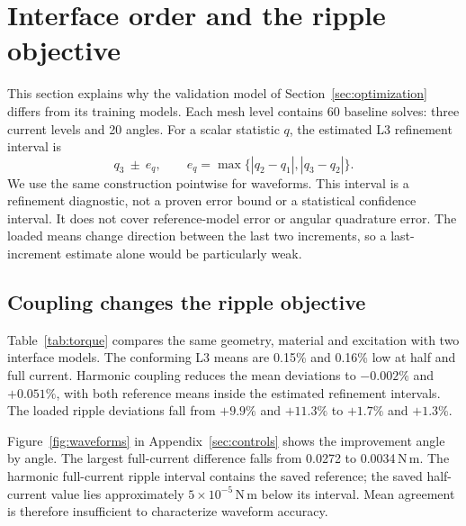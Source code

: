 \documentclass{anvil-paper}
\begin{document}


\section{Interface order and the ripple objective}\label{sec:forward}
This section explains why the validation model of
Section~\ref{sec:optimization} differs from its training models. Each mesh
level contains 60 baseline solves: three current levels and 20 angles. For
a scalar statistic $q$, the estimated L3 refinement interval is
\begin{equation}
 q_3\ \pm\ e_q,\qquad
 e_q=\max\{|q_2-q_1|,|q_3-q_2|\}.
 \label{eq:band}
\end{equation}
We use the same construction pointwise for waveforms. This interval is a
refinement diagnostic, not a proven error bound or a statistical confidence
interval. It does not cover reference-model error or angular quadrature
error. The loaded means change direction between the last two increments,
so a last-increment estimate alone would be particularly weak.

\subsection{Coupling changes the ripple objective}\label{sec:coupling-results}
Table~\ref{tab:torque} compares the same geometry, material and excitation
with two interface models. The conforming L3 means are 0.15\% and 0.16\%
low at half and full current. Harmonic coupling reduces the mean deviations
to $-0.002\%$ and $+0.051\%$, with both reference means inside the estimated
refinement intervals. The loaded ripple deviations fall from $+9.9\%$
and $+11.3\%$ to $+1.7\%$ and $+1.3\%$.

\begin{table}[htbp]\centering\small
\caption{L3 population standard deviation and mean torque, in N\,m per
sector, on the 20-angle grid. The last column gives ripple deviation from the
saved reference; n/a identifies the reference itself. The reference is
subsequently refined in Section~\ref{sec:refinement}.}
\label{tab:torque}

\end{table}

Figure~\ref{fig:waveforms} in Appendix~\ref{sec:controls} shows the improvement angle by angle. The largest
full-current difference falls from 0.0272 to 0.0034\,N\,m. The harmonic
full-current ripple interval contains the saved reference; the saved half-current
value lies approximately $5\times10^{-5}$\,N\,m below its interval.
Mean agreement is therefore insufficient to characterize waveform accuracy.
\end{document}
